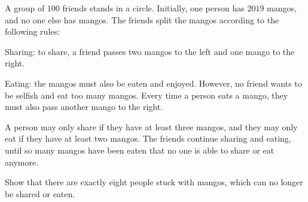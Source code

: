 \documentclass{article}
\begin{document}
\begin{prob}[USAMTS 2019]{9}
A group of $100$ friends stands in a circle. Initially, one person has $2019$ mangos, and
no one else has mangos. The friends split the mangos according to the following rules:

\begin{itemize}
     \Item Sharing: to share, a friend passes two mangos to the left and one mango to the right.

     \Item Eating: the mangos must also be eaten and enjoyed. However, no friend wants to be
selfish and eat too many mangos. Every time a person eats a mango, they must also
pass another mango to the right.
\end{itemize}

A person may only share if they have at least three mangos, and they may only eat if they
have at least two mangos. The friends continue sharing and eating, until so many mangos
have been eaten that no one is able to share or eat anymore.

Show that there are exactly eight people stuck with mangos, which can no longer be shared or eaten.
\end{prob}
%
%
\end{document}

